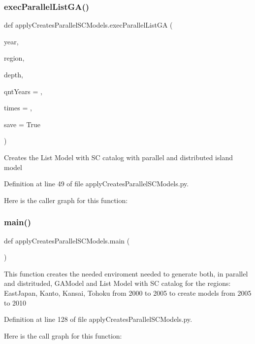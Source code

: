 \subsubsection{\texorpdfstring{exec\+Parallel\+List\+G\+A()}{execParallelListGA()}}
{\footnotesize\ttfamily def apply\+Creates\+Parallel\+S\+C\+Models.\+exec\+Parallel\+List\+GA (\begin{DoxyParamCaption}\item[{}]{year,  }\item[{}]{region,  }\item[{}]{depth,  }\item[{}]{qnt\+Years = {},  }\item[{}]{times = {},  }\item[{}]{save = {\ttfamily True} }\end{DoxyParamCaption})}

\begin{DoxyVerb}Creates the List Model with SC catalog with parallel and distributed island model
\end{DoxyVerb}
 

Definition at line 49 of file apply\+Creates\+Parallel\+S\+C\+Models.\+py.

Here is the caller graph for this function\+:
\mbox{\label{namespaceapply_creates_parallel_s_c_models_a46f86c56143b54d6ff54f2cf729eb760}} 
\subsubsection{\texorpdfstring{main()}{main()}}
{\footnotesize\ttfamily def apply\+Creates\+Parallel\+S\+C\+Models.\+main (\begin{DoxyParamCaption}{ }\end{DoxyParamCaption})}

\begin{DoxyVerb}This function creates the needed enviroment needed to generate both, in parallel and distrituded,
 GAModel and List Model  with SC catalog
for the regions: EastJapan, Kanto, Kansai, Tohoku
from 2000 to 2005 to create models from 2005 to 2010
\end{DoxyVerb}
 

Definition at line 128 of file apply\+Creates\+Parallel\+S\+C\+Models.\+py.

Here is the call graph for this function\+:
